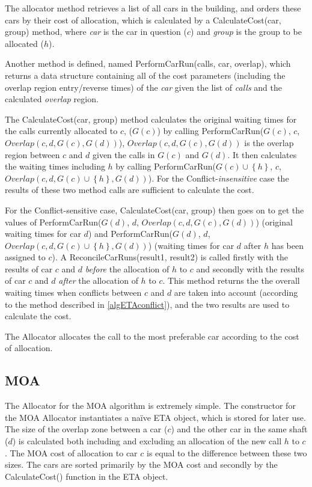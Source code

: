 \documentclass{UoYCSproject}
\begin{document}
The allocator method retrieves a list of all cars in the building, and orders these cars by their cost of allocation, which is calculated by a CalculateCost(car, group) method, where \textit{car} is the car in question ($c$) and \textit{group} is the group to be allocated ($h$).

Another method is defined, named PerformCarRun(calls, car, overlap), which returns a data structure containing all of the cost parameters (including the overlap region entry/reverse times) of the \textit{car} given the list of \textit{calls} and the calculated \textit{overlap} region.

The CalculateCost(car, group) method calculates the original waiting times for the calls currently allocated to $c$, ($G(c)$) by calling PerformCarRun($G(c)$, $c$, $Overlap(c,d,G(c),G(d))$), $Overlap(c,d,G(c),G(d))$ is the overlap region between $c$ and $d$ given the calls in $G(c)$ and $G(d)$.  It then calculates the waiting times including $h$ by calling PerformCarRun($G(c) \cup \left\{ h \right\}$, $c$, $Overlap(c,d,G(c) \cup \left\{ h \right\},G(d))$).  For the Conflict-\textit{insensitive} case the results of these two method calls are sufficient to calculate the cost.

For the Conflict-sensitive case, CalculateCost(car, group) then goes on to get the values of PerformCarRun($G(d)$, $d$, $Overlap(c,d,G(c),G(d))$) (original waiting times for car $d$) and PerformCarRun($G(d)$, $d$, $Overlap(c,d,G(c) \cup \left\{ h \right\},G(d))$) (waiting times for car $d$ after $h$ has been assigned to $c$).  A ReconcileCarRuns(result1, result2) is called firstly with the results of car $c$ and $d$ \textit{before} the allocation of $h$ to $c$ and secondly with the results of car $c$ and $d$ \textit{after} the allocation of $h$ to $c$.  This method returns the the overall waiting times when conflicts between $c$ and $d$ are taken into account (according to the method described in \autoref{algETAconflict}), and the two results are used to calculate the cost.

The Allocator allocates the call to the most preferable car according to the cost of allocation.

\subsection{MOA}

The Allocator for the MOA algorithm is extremely simple.  The constructor for the MOA Allocator instantiates a na\"{i}ve ETA object, which is stored for later use.  The size of the overlap zone between a car ($c$) and the other car in the same shaft ($d$) is calculated both including and excluding an allocation of the new call $h$ to $c$.  The MOA cost of allocation to car $c$ is equal to the difference between these two sizes.  The cars are sorted primarily by the MOA cost and secondly by the CalculateCost() function in the ETA object.
\end{document}
